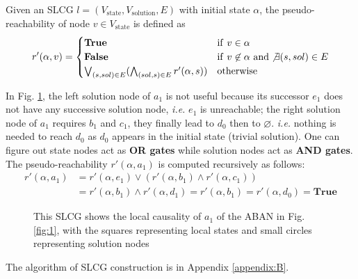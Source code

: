 \documentclass[runningheads]{llncs}
\begin{document}
\begin{definition}\label{defPseudoReach}
Given an SLCG $l=(V_{\mathrm{state}},V_{\mathrm{solution}},E)$ with initial state $\alpha$, the pseudo-reachability of node $v\in V_{\mathrm{state}}$ is defined as
\begin{equation}
\nonumber
    r'(\alpha,v)=
    \begin{cases}
    \mathrm{\bf True} & {\rm if\ } v\in \alpha\\
    \mathrm{\bf False} & {\rm if\ } v\not\in \alpha\ {\rm and} \not\exists(s,sol) \in E\\
    \bigvee_{(s,sol) \in E} (\bigwedge_{(sol,s)\in E} r'(\alpha,s)) & {\rm otherwise}
\end{cases}
\end{equation}

\end{definition}
\begin{example}
In Fig. \ref{fig:2}, the left solution node of $a_1$ is not useful because its successor $e_1$ does not have any successive solution node, \textit{i.e.} $e_1$ is unreachable;
the right solution node of $a_1$ requires $b_1$ and $c_1$, they finally lead to $d_0$ then to $\varnothing$.
\textit{i.e.} nothing is needed to reach $d_0$ as $d_0$ appears in the initial state (trivial solution).
One can figure out state nodes act as \textbf{OR gates} while solution nodes act as \textbf{AND gates}. The pseudo-reachability $r'(\alpha,a_1)$ is computed recursively as follows:
\begin{align*}
r'(\alpha,a_1)&=r'(\alpha,e_1)\lor(r'(\alpha,b_1)\land r'(\alpha,c_1))\\
&=r'(\alpha,b_1)\land r'(\alpha,d_1)=r'(\alpha,b_1)=r'(\alpha,d_0)=\mathbf{True}
\end{align*}
\end{example}

\begin{figure}[ht]
\centering

\caption{This SLCG shows the local causality of $a_1$ of the ABAN in Fig. \ref{fig:1}, with the squares representing local states and small circles representing solution nodes}
\label{fig:2}
\end{figure}

The algorithm of SLCG construction is in Appendix \ref{appendix:B}.
\end{document}
